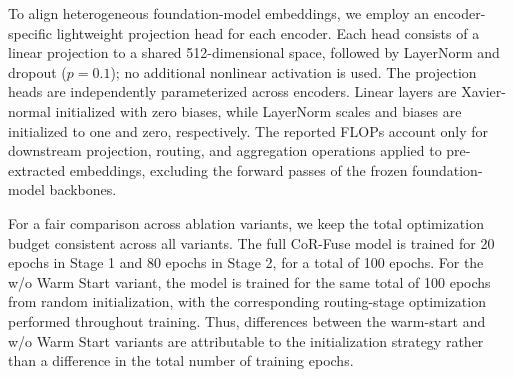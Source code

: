 To align heterogeneous foundation-model embeddings, we employ an encoder-specific lightweight projection head for each encoder. Each head consists of a linear projection to a shared 512-dimensional space, followed by LayerNorm and dropout (\(p=0.1\)); no additional nonlinear activation is used. The projection heads are independently parameterized across encoders. Linear layers are Xavier-normal initialized with zero biases, while LayerNorm scales and biases are initialized to one and zero, respectively.
The reported FLOPs account only for downstream projection, routing, and aggregation operations applied to pre-extracted embeddings, excluding the forward passes of the frozen foundation-model backbones.

For a fair comparison across ablation variants, we keep the total optimization budget consistent across all variants. The full CoR-Fuse model is trained for 20 epochs in Stage 1 and 80 epochs in Stage 2, for a total of 100 epochs. For the w/o Warm Start variant, the model is trained for the same total of 100 epochs from random initialization, with the corresponding routing-stage optimization performed throughout training.
Thus, differences between the warm-start and w/o Warm Start variants are attributable to the initialization strategy rather than a difference in the total number of training epochs.

